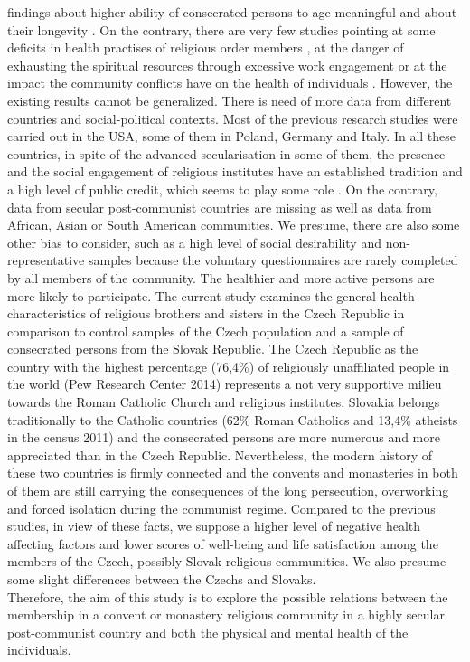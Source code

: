 \documentclass[ijerph,article,accept,moreauthors,pdftex]{mdpi}
\begin{document}
findings about higher ability of consecrated persons to age meaningful
\citep{corwin2020care} and about their longevity
\citep{weinstein2019autonomous, danner2001positive}. On the contrary,
there are very few studies pointing at some deficits in health practises
of religious order members \citep{meurer1990exploratory}, at the danger
of exhausting the spiritual resources through excessive work engagement
\citep{bickerton2013spiritual} or at the impact the community conflicts
have on the health of individuals \citep{bowen2018community}. However,
the existing results cannot be generalized. There is need of more data
from different countries and social-political contexts. Most of the
previous research studies were carried out in the USA, some of them in
Poland, Germany and Italy. In all these countries, in spite of the
advanced secularisation in some of them, the presence and the social
engagement of religious institutes have an established tradition and a
high level of public credit, which seems to play some role
\citep{rogowska2020investigating}. On the contrary, data from secular
post-communist countries are missing as well as data from African, Asian
or South American communities. We presume, there are also some other
bias to consider, such as a high level of social desirability and
non-representative samples because the voluntary questionnaires are
rarely completed by all members of the community. The healthier and more
active persons are more likely to participate. The current study
examines the general health characteristics of religious brothers and
sisters in the Czech Republic in comparison to control samples of the
Czech population and a sample of consecrated persons from the Slovak
Republic. The Czech Republic as the country with the highest percentage
(76,4\%) of religiously unaffiliated people in the world (Pew Research
Center 2014) represents a not very supportive milieu towards the Roman
Catholic Church and religious institutes. Slovakia belongs traditionally
to the Catholic countries (62\% Roman Catholics and 13,4\% atheists in
the census 2011) and the consecrated persons are more numerous and more
appreciated than in the Czech Republic. Nevertheless, the modern history
of these two countries is firmly connected and the convents and
monasteries in both of them are still carrying the consequences of the
long persecution, overworking and forced isolation during the communist
regime. Compared to the previous studies, in view of these facts, we
suppose a higher level of negative health affecting factors and lower
scores of well-being and life satisfaction among the members of the
Czech, possibly Slovak religious communities. We also presume some
slight differences between the Czechs and Slovaks.\\
Therefore, the aim of this study is to explore the possible relations
between the membership in a convent or monastery religious community in
a highly secular post-communist country and both the physical and mental
health of the individuals.
\end{document}
